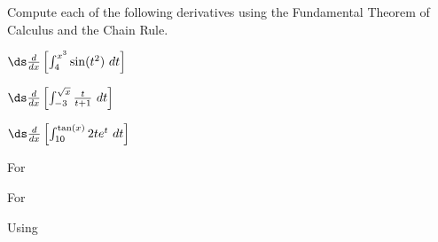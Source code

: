 \begin{activity} \label{A:5.2.4}  
Compute each of the following derivatives using the Fundamental Theorem of Calculus and the Chain Rule.
\ba
\item $\ds \frac{d}{dx} \left[ \int_4^{x^3} \sin(t^2) \ dt \right]$
\item $\ds \frac{d}{dx} \left[ \int_{-3}^{\sqrt{x}} \frac{t}{t+1} \ dt \right]$
\item $\ds \frac{d}{dx} \left[ \int_{10}^{\tan(x)} 2t e^t \ dt \right]$
\ea
\end{activity}
\begin{smallhint}
\ba
	\item For 
\ea
\end{smallhint}
\begin{bighint}
\ba
	\item For 
\ea
\end{bighint}
\begin{activitySolution}
\ba
	\item Using 
\ea
\end{activitySolution}
\aftera